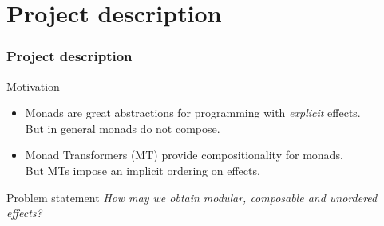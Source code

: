 \section{Project description}
\begin{frame}[fragile]
  \frametitle{Project description}
  \begin{block}{Motivation}
    \begin{itemize}
      \item Monads are great abstractions for programming with \emph{explicit} effects.\\
            But in general monads do not compose.
      \item Monad Transformers (MT) provide compositionality for monads.\\
            But MTs impose an implicit ordering on effects.
    \end{itemize}
  \end{block}    
  \begin{block}{Problem statement}
    \emph{How may we obtain modular, composable and unordered effects?}
  \end{block}

  

\end{frame}

